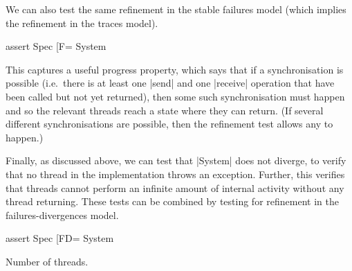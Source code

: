 We can also test the same refinement in the stable failures model (which
implies the refinement in the traces model).
%
\begin{cspm}
assert Spec [F= System
\end{cspm}
%
This captures a useful progress property, which says that if a synchronisation
is possible (i.e.~there is at least one |send| and one |receive| operation
that have been called but not yet returned), then some such synchronisation
must happen and so the relevant threads reach a state where they can return.  
(If several different synchronisations are possible, then the refinement test
allows any to happen.) 

Finally, as discussed above, we can test that |System| does not diverge, to
verify that no thread in the implementation throws an exception.  Further,
this verifies that threads cannot perform an infinite amount of internal
activity without any thread returning.  These tests can be combined by testing
for refinement in the failures-divergences model.
%
\begin{cspm}
assert Spec [FD= System
\end{cspm}

\framebox{**} Number of threads.
